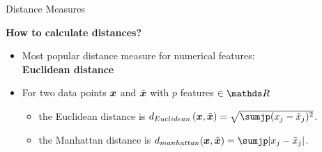 \documentclass[11pt,compress,t,notes=noshow, xcolor=table]{beamer}
\begin{document}
\begin{vbframe}{Distance Measures}

\textbf{How to calculate distances?}
  \begin{itemize}
    \item Most popular distance measure for numerical features: \\
    \textbf{Euclidean distance}
    \item For two data points $\bm{x}$ and $\tilde{\bm{x}}$ with $p$ features $\in \R$
      \begin{itemize}
        \item the Euclidean distance is
        $d_{Euclidean}\left(\xv, \tilde{\xv}\right) = \sqrt{\sumjp(x_j- \tilde{x}_j)^2}$.
      
        \item the Manhattan distance is %
              $d_{manhattan}(\xv, \tilde{\xv}) = \sumjp |x_j - \tilde{x}_j|$.
      \end{itemize}   
    \end{itemize}

    


\end{vbframe}
\end{document}
